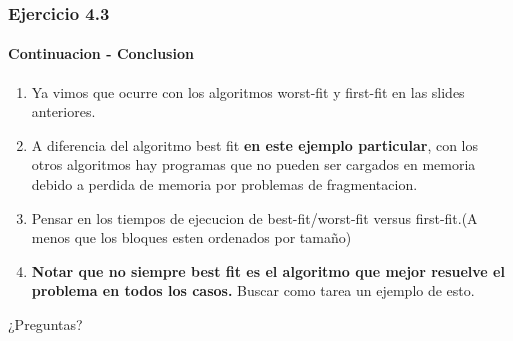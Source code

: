 \documentclass{beamer}
\begin{document}
\begin{frame}
  \frametitle{Ejercicio 4.3}    
  \framesubtitle{Continuacion - Conclusion}    
    \begin{enumerate}
    \setlength{\itemsep}{5pt}    
    \item Ya vimos que ocurre con los algoritmos worst-fit y first-fit en las slides anteriores.
    \pause
    \item A diferencia del algoritmo best fit \textbf{en este ejemplo particular}, con los otros algoritmos hay programas que no pueden ser cargados en memoria debido a perdida de memoria por problemas de fragmentacion.
    \pause
    \item Pensar en los tiempos de ejecucion de best-fit/worst-fit versus first-fit.(A menos que los bloques esten ordenados por tamaño)
    \pause
    \item \textbf{Notar que no siempre best fit es el algoritmo que mejor resuelve el problema en todos los casos.} Buscar como tarea un ejemplo de esto.
  \end{enumerate}
\end{frame}

\begin{frame}
  \begin{center}
  \huge ¿Preguntas?
  \end{center}
\end{frame}
\end{document}
